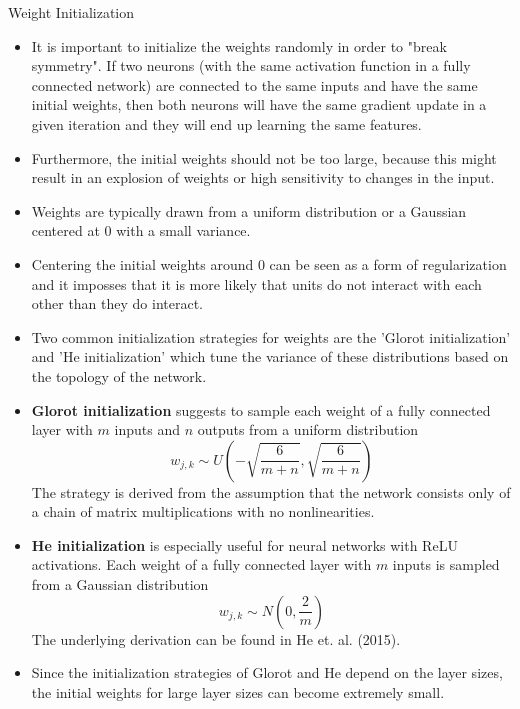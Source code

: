 \documentclass[11pt,compress,t,notes=noshow, xcolor=table]{beamer}
\begin{document}
\begin{vbframe}{Weight Initialization}
  \begin{itemize}
    \item It is important to initialize the weights randomly in order to "break symmetry". If two neurons (with the same activation function in a fully connected network) are connected to the same inputs and have the same initial weights, then both neurons will have the same gradient update in a given iteration and they will end up learning the same features.
    \item Furthermore, the initial weights should not be too large, because this might result in an explosion of weights or high sensitivity to changes in the input.
    \item Weights are typically drawn from a uniform distribution or a Gaussian centered at 0 with a small variance.
    \item Centering the initial weights around 0 can be seen as a form of regularization and it imposses that it is more likely that units do not interact with each other than they do interact.
    \framebreak
    \item Two common initialization strategies for weights are the 'Glorot initialization' and 'He initialization' which tune the variance of these distributions based on the topology of the network. %
    \item \textbf{Glorot initialization} suggests to sample each weight of a fully connected layer with $m$ inputs and $n$ outputs from a uniform distribution
    \begin{equation*}
      w_{j,k} \sim U\left(-\sqrt{\frac{6}{m+n}},\sqrt{\frac{6}{m+n}}\right)
    \end{equation*}
   The strategy is derived from the assumption that the network consists only of a chain of matrix multiplications with no nonlinearities. 
    \item \textbf{He initialization} is especially useful for neural networks with ReLU activations. Each weight of a fully connected layer with $m$ inputs is sampled from a Gaussian distribution 
    \begin{equation*}
      w_{j, k} \sim N\left(0, \frac{2}{m}\right)
    \end{equation*}
    The underlying derivation can be found in He et. al. (2015).
    \item Since the initialization strategies of Glorot and He depend on the layer sizes, the initial weights for large layer sizes can become extremely small.

\end{itemize}
\end{vbframe}
\end{document}

